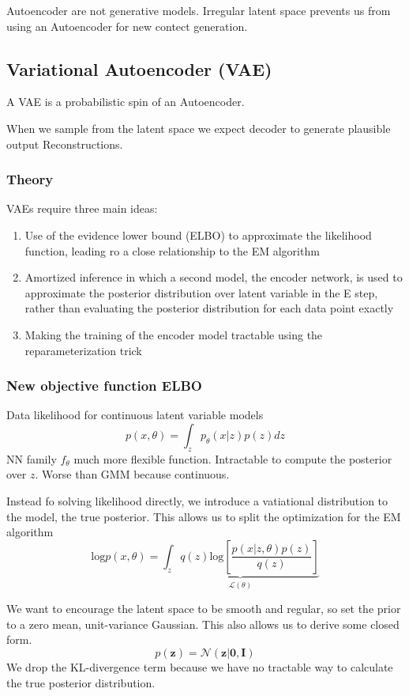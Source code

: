 Autoencoder are not generative models.
Irregular latent space prevents us from using an Autoencoder for new contect generation.

\subsection{Variational Autoencoder (VAE)}
A VAE is a probabilistic spin of an Autoencoder.

When we sample from the latent space we expect decoder to generate plausible output Reconstructions.

\subsubsection{Theory}
VAEs require three main ideas:
\begin{enumerate}
    \item Use of the evidence lower bound (ELBO) to approximate the likelihood function, leading ro a close relationship to the EM algorithm
    \item Amortized inference in which a second model, the encoder network, is used to approximate the posterior distribution over latent variable in the E step, rather than evaluating the posterior distribution for each data point exactly
    \item Making the training of the encoder model tractable using the reparameterization trick
\end{enumerate}

\subsubsection*{New objective function ELBO}
Data likelihood for continuous latent variable models
\[
p(x,\theta) = \int_{z} p_\theta(x|z)p(z)dz
\]
NN family \(f_\theta\) much more flexible function.
Intractable to compute the posterior over \(z\).
Worse than GMM because continuous.

Instead fo solving likelihood directly, we introduce a vatiational distribution to the model, the true posterior.
This allows us to split the optimization for the EM algorithm
\[
\text{log} p(x,\theta)  = \underbrace{\int_z q(z)\text{log}\left[\frac{p(x|z,\theta)p(z)}{q(z)}\right]}_{\mathcal{L}(\theta)}
\]

We want to encourage the latent space to be smooth and regular, so set the prior to a zero mean, unit-variance Gaussian.
This also allows us to derive some closed form.
\[
p(\mathbf{z}) = \mathcal{N}(\mathbf{z}|\mathbf{0,I})
\]
We drop the KL-divergence term because we have no tractable way to calculate the true posterior distribution.

